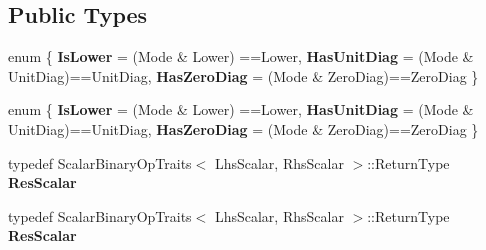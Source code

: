 \subsection*{Public Types}
\begin{DoxyCompactItemize}
\item 
\mbox{\label{structinternal_1_1packed__triangular__matrix__vector__product_3_01_index_00_01_mode_00_01_lhs_sc27c8536a613da6e5ab28fe48015c06ef_a720fb21682216a980903d61a6dd8fd25}} 
enum \{ {\bfseries Is\+Lower} = (Mode \& Lower) ==Lower, 
{\bfseries Has\+Unit\+Diag} = (Mode \& Unit\+Diag)==Unit\+Diag, 
{\bfseries Has\+Zero\+Diag} = (Mode \& Zero\+Diag)==Zero\+Diag
 \}
\item 
\mbox{\label{structinternal_1_1packed__triangular__matrix__vector__product_3_01_index_00_01_mode_00_01_lhs_sc27c8536a613da6e5ab28fe48015c06ef_aca680ba3539bc053c80235d32558cda5}} 
enum \{ {\bfseries Is\+Lower} = (Mode \& Lower) ==Lower, 
{\bfseries Has\+Unit\+Diag} = (Mode \& Unit\+Diag)==Unit\+Diag, 
{\bfseries Has\+Zero\+Diag} = (Mode \& Zero\+Diag)==Zero\+Diag
 \}
\item 
\mbox{\label{structinternal_1_1packed__triangular__matrix__vector__product_3_01_index_00_01_mode_00_01_lhs_sc27c8536a613da6e5ab28fe48015c06ef_a3449e8d82450f53ad5fe35eb8ae73d1a}} 
typedef Scalar\+Binary\+Op\+Traits$<$ Lhs\+Scalar, Rhs\+Scalar $>$\+::Return\+Type {\bfseries Res\+Scalar}
\item 
\mbox{\label{structinternal_1_1packed__triangular__matrix__vector__product_3_01_index_00_01_mode_00_01_lhs_sc27c8536a613da6e5ab28fe48015c06ef_a3449e8d82450f53ad5fe35eb8ae73d1a}} 
typedef Scalar\+Binary\+Op\+Traits$<$ Lhs\+Scalar, Rhs\+Scalar $>$\+::Return\+Type {\bfseries Res\+Scalar}
\end{DoxyCompactItemize}
